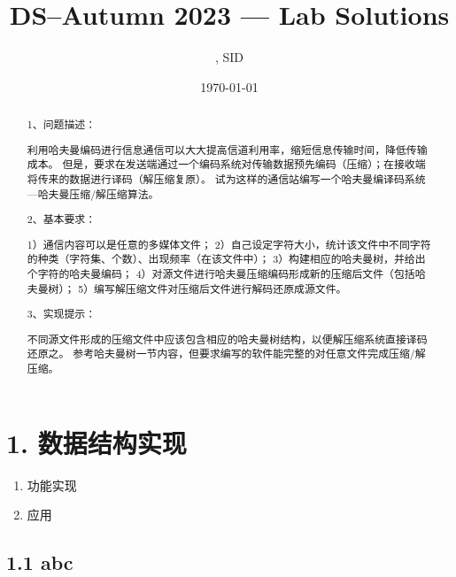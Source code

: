 \documentclass[UTF8]{ctexart}
\title{DS--Autumn 2023 --- Lab \Lab    Solutions} %
\author{\Name, SID \SID} %
\date{\today} %
\newenvironment{qparts}{\begin{enumerate}[{(}a{)}]}{\end{enumerate}} %
\begin{document}
\maketitle


\begin{abstract}
    1、问题描述：

        利用哈夫曼编码进行信息通信可以大大提高信道利用率，缩短信息传输时间，降低传输成本。
        但是，要求在发送端通过一个编码系统对传输数据预先编码（压缩）；在接收端将传来的数据进行译码（解压缩复原）。
        试为这样的通信站编写一个哈夫曼编译码系统---哈夫曼压缩/解压缩算法。

    2、基本要求：

        1）通信内容可以是任意的多媒体文件；
        2）自己设定字符大小，统计该文件中不同字符的种类（字符集、个数）、出现频率（在该文件中）；
        3）构建相应的哈夫曼树，并给出个字符的哈夫曼编码；
        4）对源文件进行哈夫曼压缩编码形成新的压缩后文件（包括哈夫曼树）；
        5）编写解压缩文件对压缩后文件进行解码还原成源文件。

    3、实现提示：

        不同源文件形成的压缩文件中应该包含相应的哈夫曼树结构，以便解压缩系统直接译码还原之。
        参考哈夫曼树一节内容，但要求编写的软件能完整的对任意文件完成压缩/解压缩。  


\end{abstract}







\section*{1. 数据结构实现}
\begin{qparts}
    \item 功能实现


    \item 应用 
    
\end{qparts}



\subsection*{1.1 abc}
\end{document}
